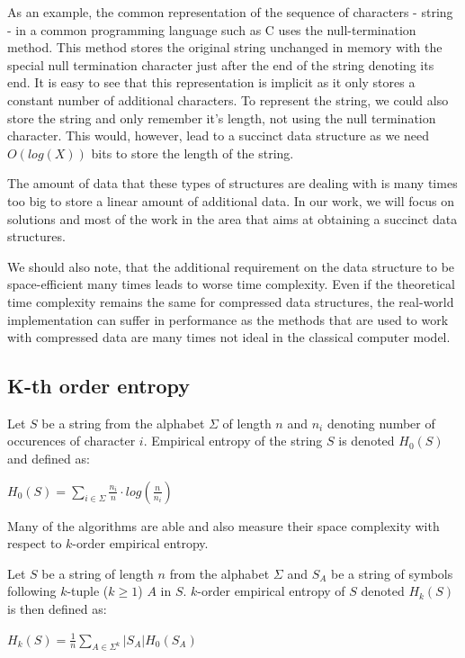 As an example, the common representation of the sequence of characters - string - in a common programming language such as C uses the null-termination method. This method stores the original string unchanged in memory with the special null termination character just after the end of the string denoting its end. It is easy to see that this representation is implicit as it only stores a constant number of additional characters. To represent the string, we could also store the string and only remember it's length, not using the null termination character. This would, however, lead to a succinct data structure as we need $O(log(X))$ bits to store the length of the string.

The amount of data that these types of structures are dealing with is many times too big to store a linear amount of additional data. In our work, we will focus on solutions and most of the work in the area that aims at obtaining a succinct data structures.

We should also note, that the additional requirement on the data structure to be space-efficient many times leads to worse time complexity. Even if the theoretical time complexity remains the same for compressed data structures, the real-world implementation can suffer in performance as the methods that are used to work with compressed data are many times not ideal in the classical computer model.

\subsection{K-th order entropy}

\begin{theorem}
Let $S$ be a string from the alphabet $\Sigma$ of length $n$ and $n_i$ denoting number of occurences of character
$i$. Empirical entropy of the string $S$ is denoted $H_0(S)$ and defined as:
\begin{center}
$H_0(S) = \sum_{i \in \Sigma} \frac{n_i}{n}\cdot log(\frac{n}{n_i})$
\end{center}
\end{theorem}

Many of the algorithms are able and also measure their space complexity with respect to $k$-order empirical entropy.

\begin{theorem}
Let $S$ be a string of length $n$ from the alphabet $\Sigma$ and $S_A$ be a string of symbols following $k$-tuple ($k \geq 1$) $A$ in $S$. $k$-order empirical entropy of $S$ denoted $H_k(S)$ is then defined as:
\begin{center}
$H_k(S) = \frac{1}{n} \sum_{A \in \Sigma^k} |S_A| H_0(S_A)$
\end{center}
\end{theorem}

